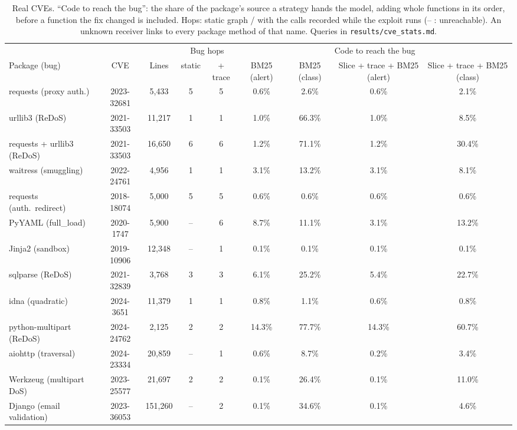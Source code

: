 \documentclass[10pt,a4paper]{article}
\newcommand{\code}[1]{\texttt{#1}}
\begin{document}
\begin{table}[H]
\centering\small
\caption{Real CVEs. ``Code to reach the bug'': the share of the package's source a strategy hands the model, adding whole functions in its order, before a function the fix changed is included. Hops: static graph / with the calls recorded while the exploit runs (-- : unreachable). An unknown receiver links to every package method of that name. Queries in \code{results/cve\_stats.md}.}
\label{tab:cve}
\begin{adjustbox}{max width=\linewidth}\begin{tabular}{lcccccccc}
\toprule
& & & \multicolumn{2}{c}{Bug hops} & \multicolumn{4}{c}{Code to reach the bug}\\
\cmidrule(lr){4-5}\cmidrule(lr){6-9}
Package (bug) & CVE & Lines & static & + trace & BM25 (alert) & BM25 (class) & Slice + trace + BM25 (alert) & Slice + trace + BM25 (class)\\
\midrule
requests (proxy auth.) & 2023-32681 & 5,433 & 5 & 5 & 0.6\% & 2.6\% & 0.6\% & 2.1\%\\
urllib3 (ReDoS) & 2021-33503 & 11,217 & 1 & 1 & 1.0\% & 66.3\% & 1.0\% & 8.5\%\\
requests + urllib3 (ReDoS) & 2021-33503 & 16,650 & 6 & 6 & 1.2\% & 71.1\% & 1.2\% & 30.4\%\\
waitress (smuggling) & 2022-24761 & 4,956 & 1 & 1 & 3.1\% & 13.2\% & 3.1\% & 8.1\%\\
requests (auth.\ redirect) & 2018-18074 & 5,000 & 5 & 5 & 0.6\% & 0.6\% & 0.6\% & 0.6\%\\
PyYAML (full\_load) & 2020-1747 & 5,900 & -- & 6 & 8.7\% & 11.1\% & 3.1\% & 13.2\%\\
Jinja2 (sandbox) & 2019-10906 & 12,348 & -- & 1 & 0.1\% & 0.1\% & 0.1\% & 0.1\%\\
sqlparse (ReDoS) & 2021-32839 & 3,768 & 3 & 3 & 6.1\% & 25.2\% & 5.4\% & 22.7\%\\
idna (quadratic) & 2024-3651 & 11,379 & 1 & 1 & 0.8\% & 1.1\% & 0.6\% & 0.8\%\\
python-multipart (ReDoS) & 2024-24762 & 2,125 & 2 & 2 & 14.3\% & 77.7\% & 14.3\% & 60.7\%\\
aiohttp (traversal) & 2024-23334 & 20,859 & -- & 1 & 0.6\% & 8.7\% & 0.2\% & 3.4\%\\
Werkzeug (multipart DoS) & 2023-25577 & 21,697 & 2 & 2 & 0.1\% & 26.4\% & 0.1\% & 11.0\%\\
Django (email validation) & 2023-36053 & 151,260 & -- & 2 & 0.1\% & 34.6\% & 0.1\% & 4.6\%\\
\bottomrule
\end{tabular}\end{adjustbox}
\end{table}
\end{document}
